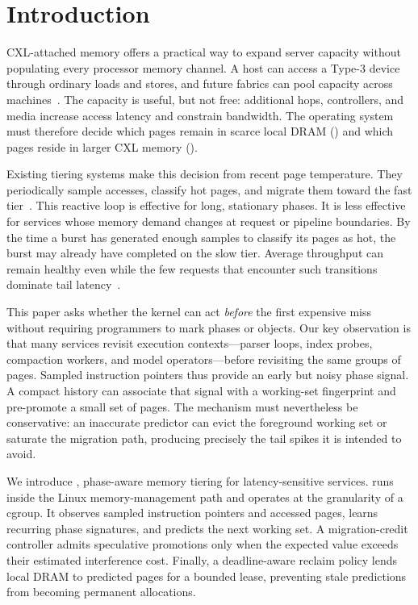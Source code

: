 \section{Introduction}
\label{sec:introduction}

CXL-attached memory offers a practical way to expand server capacity without
populating every processor memory channel.  A host can access a Type-3 device
through ordinary loads and stores, and future fabrics can pool capacity across
machines~\cite{cxl30}.  The capacity is useful, but not free: additional hops,
controllers, and media increase access latency and constrain bandwidth.  The
operating system must therefore decide which pages remain in scarce local DRAM
(\fast) and which pages reside in larger CXL memory (\slow).

Existing tiering systems make this decision from recent page temperature.
They periodically sample accesses, classify hot pages, and migrate them toward
the fast tier~\cite{agarwal2017thermostat,yan2019nimble,raybuck2021hemem,
maruf2023tpp}.  This reactive loop is effective for long, stationary phases.
It is less effective for services whose memory demand changes at request or
pipeline boundaries.  By the time a burst has generated enough samples to
classify its pages as hot, the burst may already have completed on the slow
tier.  Average throughput can remain healthy even while the few requests that
encounter such transitions dominate tail latency~\cite{dean2013tail}.

This paper asks whether the kernel can act \emph{before} the first expensive
miss without requiring programmers to mark phases or objects.  Our key
observation is that many services revisit execution contexts---parser loops,
index probes, compaction workers, and model operators---before revisiting the
same groups of pages.  Sampled instruction pointers thus provide an early but
noisy phase signal.  A compact history can associate that signal with a
working-set fingerprint and pre-promote a small set of pages.  The mechanism
must nevertheless be conservative: an inaccurate predictor can evict the
foreground working set or saturate the migration path, producing precisely the
tail spikes it is intended to avoid.

We introduce \system, phase-aware memory tiering for latency-sensitive
services.  \system runs inside the Linux memory-management path and operates at
the granularity of a cgroup.  It observes sampled instruction pointers and
accessed pages, learns recurring phase signatures, and predicts the next
working set.  A migration-credit controller admits speculative promotions only
when the expected value exceeds their estimated interference cost.  Finally, a
deadline-aware reclaim policy lends local DRAM to predicted pages for a bounded
lease, preventing stale predictions from becoming permanent allocations.

